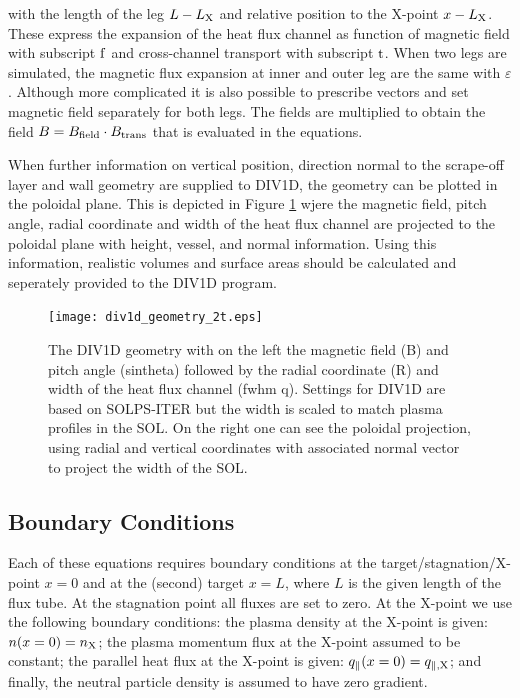 \documentclass[amsmath,amssymb,a4]{revtex4-2}
\begin{document}
with the length of the leg $L - L_{\rm X}$ and relative position to the X-point $x-L_{\rm X}$. These express the expansion of the heat flux channel as function of magnetic field with subscript $\rm f$ and cross-channel transport with subscript $\rm t$. When two legs are simulated, the magnetic flux expansion at inner and outer leg are the same with $\varepsilon$. Although more complicated it is also possible to prescribe vectors and set magnetic field separately for both legs. The fields are multiplied to obtain the field $B=B_{\rm field} \cdot B_{\rm trans}$ that is evaluated in the equations.  

\noindent When further information on vertical position, direction normal to the scrape-off layer and wall geometry are supplied to DIV1D, the geometry can be plotted in the poloidal plane. This is depicted in Figure \ref{fig:div1d-geometry} wjere the magnetic field, pitch angle, radial coordinate and width of the heat flux channel are projected to the poloidal plane with height, vessel, and normal information. Using this information, realistic volumes and surface areas should be calculated and seperately provided to the DIV1D program.
\begin{figure}[h]
    \centering
    \texttt{[image: div1d\_geometry\_2t.eps]}
    \caption{The DIV1D geometry with on the left the magnetic field (B) and pitch angle (sintheta) followed by the radial coordinate (R) and width of the heat flux channel (fwhm q). Settings for DIV1D are based on SOLPS-ITER but the width is scaled to match plasma profiles in the SOL. On the right one can see the poloidal projection, using radial and vertical coordinates with associated normal vector to project the width of the SOL.}
    \label{fig:div1d-geometry}
\end{figure}

\subsection{Boundary Conditions}

Each of these equations requires boundary conditions at the target/stagnation/X-point $x=0$ and at the (second) target $x=L$, where $L$ is the given length of the flux tube. At the stagnation point all fluxes are set to zero. At the X-point we use the following boundary conditions:
the plasma density at the X-point is given: $n(x=0) = n_{\rm X}$; the plasma momentum flux at the X-point assumed to be constant; the parallel heat flux at the X-point is given:  $q_\parallel(x=0) = q_{\parallel,\rm X}$; and finally, the neutral particle density is assumed to have zero gradient.
\end{document}
